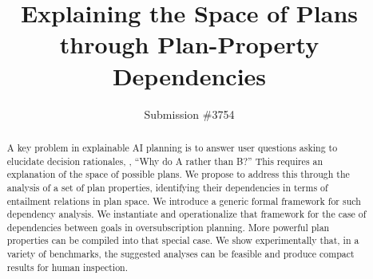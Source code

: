 \documentclass{article}
\begin{document}
\title{Explaining the Space of Plans through Plan-Property Dependencies}

\author{Submission \#3754}

%

\maketitle

\begin{abstract}
A key problem in explainable AI planning is to answer user questions
asking to elucidate decision rationales, \eg, ``Why do A rather than
B?'' This requires an explanation of the space of possible plans. We
propose to address this through the analysis of a set of plan
properties, identifying their dependencies in terms of entailment
relations in plan space. We introduce a generic formal framework for
such dependency analysis. We instantiate and operationalize that
framework for the case of dependencies between goals in
oversubscription planning.
%
%
%
More powerful plan properties can be compiled into that special case.
%
We show experimentally that, in a variety of benchmarks, the suggested
analyses can be feasible and produce compact results for human
inspection.
\end{abstract}
\end{document}
